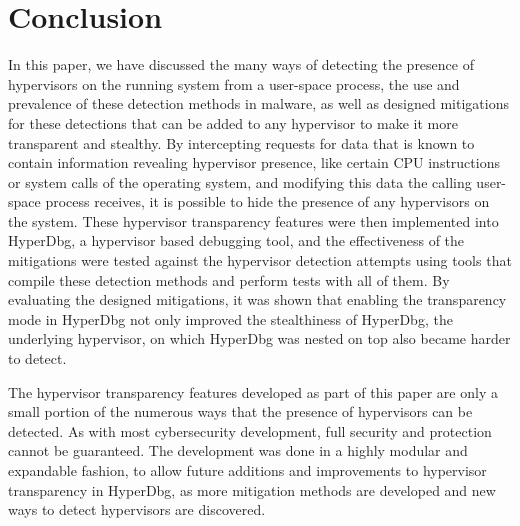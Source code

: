 \clearpage
\section{Conclusion}\label{s:conclusion}

In this paper, we have discussed the many ways of detecting the presence of hypervisors on the running system from a user-space process, 
the use and prevalence of these detection methods in malware, as well as designed mitigations for these detections that can be added to any hypervisor to make it more transparent and stealthy. 
By intercepting requests for data that is known to contain information revealing hypervisor presence, like certain CPU instructions or system calls of the operating system, 
and modifying this data the calling user-space process receives, it is possible to hide the presence of any hypervisors on the system. 
These hypervisor transparency features were then implemented into HyperDbg, a hypervisor based debugging tool, and the effectiveness of the mitigations were 
tested against the hypervisor detection attempts using tools that compile these detection methods and perform tests with all of them. By evaluating the designed mitigations, 
it was shown that enabling the transparency mode in HyperDbg not only improved the stealthiness of HyperDbg, the underlying hypervisor, on which HyperDbg was nested on top also 
became harder to detect.

The hypervisor transparency features developed as part of this paper are only a small portion of the numerous ways that the presence of hypervisors can be detected. 
As with most cybersecurity development, full security and protection cannot be guaranteed. The development was done in a highly modular and expandable fashion, 
to allow future additions and improvements to hypervisor transparency in HyperDbg, as more mitigation methods are developed and new ways to detect hypervisors are discovered. 




